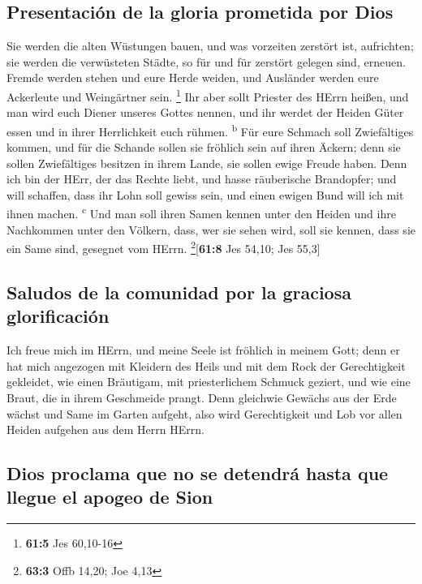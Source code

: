 \hypertarget{presentaciuxf3n-de-la-gloria-prometida-por-dios}{%
\subsection{Presentación de la gloria prometida por
Dios}\label{presentaciuxf3n-de-la-gloria-prometida-por-dios}}

 Sie werden die alten Wüstungen bauen, und was vorzeiten
zerstört ist, aufrichten; sie werden die verwüsteten Städte, so für und
für zerstört gelegen sind, erneuen.  Fremde werden stehen
und eure Herde weiden, und Ausländer werden eure Ackerleute und
Weingärtner sein. \footnote{\textbf{61:5} Jes 60,10-16} 
Ihr aber sollt Priester des HErrn heißen, und man wird euch Diener
unseres Gottes nennen, und ihr werdet der Heiden Güter essen und in
ihrer Herrlichkeit euch rühmen. \textsuperscript{b}  Für
eure Schmach soll Zwiefältiges kommen, und für die Schande sollen sie
fröhlich sein auf ihren Äckern; denn sie sollen Zwiefältiges besitzen in
ihrem Lande, sie sollen ewige Freude haben.  Denn ich bin
der HErr, der das Rechte liebt, und hasse räuberische Brandopfer; und
will schaffen, dass ihr Lohn soll gewiss sein, und einen ewigen Bund
will ich mit ihnen machen. \textsuperscript{c}  Und man
soll ihren Samen kennen unter den Heiden und ihre Nachkommen unter den
Völkern, dass, wer sie sehen wird, soll sie kennen, dass sie ein Same
sind, gesegnet vom HErrn. \footnote{\textbf{63:3} Offb 14,20; Joe 4,13}{[}\textbf{61:8}
Jes 54,10; Jes 55,3{]}

\hypertarget{saludos-de-la-comunidad-por-la-graciosa-glorificaciuxf3n}{%
\subsection{Saludos de la comunidad por la graciosa
glorificación}\label{saludos-de-la-comunidad-por-la-graciosa-glorificaciuxf3n}}

 Ich freue mich im HErrn, und meine Seele ist fröhlich in
meinem Gott; denn er hat mich angezogen mit Kleidern des Heils und mit
dem Rock der Gerechtigkeit gekleidet, wie einen Bräutigam, mit
priesterlichem Schmuck geziert, und wie eine Braut, die in ihrem
Geschmeide prangt.  Denn gleichwie Gewächs aus der Erde
wächst und Same im Garten aufgeht, also wird Gerechtigkeit und Lob vor
allen Heiden aufgehen aus dem Herrn HErrn.

\hypertarget{dios-proclama-que-no-se-detendruxe1-hasta-que-llegue-el-apogeo-de-sion}{%
\subsection{Dios proclama que no se detendrá hasta que llegue el apogeo
de
Sion}\label{dios-proclama-que-no-se-detendruxe1-hasta-que-llegue-el-apogeo-de-sion}}

